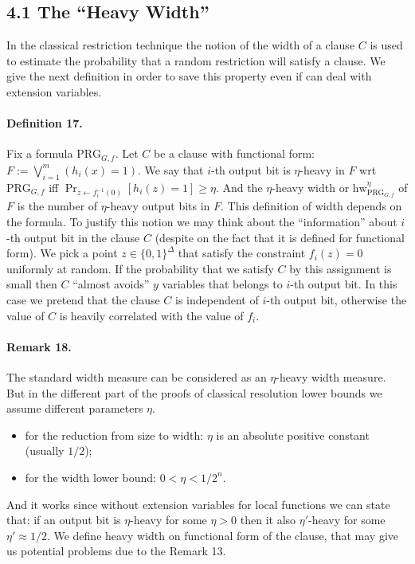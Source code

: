\subsection*{4.1 The ``Heavy Width''}
In the classical restriction technique the notion of the width of a clause $C$ is used to estimate the probability that a random restriction will satisfy a clause. We give the next definition in order to save this property even if can deal with extension variables.
\paragraph{Definition 17.} Fix a formula $\mathrm{PRG}_{G,f}$. Let $C$ be a clause with functional form: $F:=\bigvee_{i=1}^m(h_i(x)=1)$. We say that $i$-th output bit is $\eta$-heavy in $F$ wrt $\mathrm{PRG}_{G,f}$ iff $\Pr_{z\leftarrow f_i^{-1}(0)}[h_i(z)=1]\geq\eta$. And the $\eta$-heavy width or $\mathrm{hw}_{\mathrm{PRG}_{G,f}}^\eta$ of $F$ is the number of $\eta$-heavy output bits in $F$.
This definition of width depends on the formula.
To justify this notion we may think about the ``information'' about $i$-th output bit in the clause $C$ (despite on the fact that it is defined for functional form). We pick a point $z\in\{0,1\}^\Delta$ that satisfy the constraint $f_i(z)=0$ uniformly at random. If the probability that we satisfy $C$ by this assignment is small then $C$ ``almost avoids'' $y$ variables that belongs to $i$-th output bit. In this case we pretend that the clause $C$ is independent of $i$-th output bit, otherwise the value of $C$ is heavily correlated with the value of $f_i$.
\paragraph{Remark 18.} The standard width measure can be considered as an $\eta$-heavy width measure. But in the different part of the proofs of classical resolution lower bounds we assume different parameters $\eta$.
\begin{itemize}
\item for the reduction from size to width: $\eta$ is an absolute positive constant (usually $1/2$);
\item for the width lower bound: $0<\eta<1/2^n$.
\end{itemize}
And it works since without extension variables for local functions we can state that: if an output bit is $\eta$-heavy for some $\eta>0$ then it also $\eta'$-heavy for some $\eta'\approx1/2$.
We define heavy width on functional form of the clause, that may give us potential problems due to the Remark 13.
